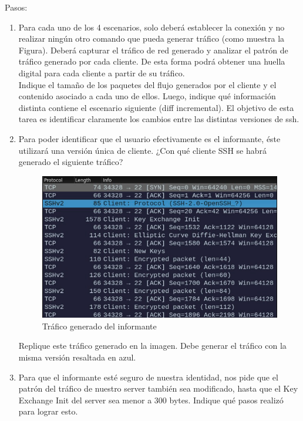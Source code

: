 \documentclass[letter,12pt]{article}
\begin{document}
Pasos:

\begin{enumerate}
\item Para cada uno de los 4 escenarios, solo deberá establecer la conexión y no realizar ningún otro comando que pueda generar tráfico (como muestra la Figura). Deberá capturar el tráfico de red generado y analizar el patrón de tráfico generado por cada cliente. De esta forma podrá obtener una huella digital para cada cliente a partir de su tráfico.\\

Indique el tamaño de los paquetes del flujo generados por el cliente y el contenido asociado a cada uno de ellos. Luego, indique qué información distinta contiene el escenario siguiente (diff incremental). El objetivo de esta tarea es identificar claramente los cambios entre las distintas versiones de ssh.

\newpage

\item Para poder identificar que el usuario efectivamente es el informante, éste utilizará una versión única de cliente. ¿Con qué cliente SSH se habrá generado el siguiente tráfico?

\begin{figure}[H]
    \centering
    \includegraphics[width=17.5cm]{Desarrollo/trafico.png}
    \caption{Tráfico generado del informante}
    \label{fig:ASCII}
\end{figure}

Replique este tráfico generado en la imagen. Debe generar el tráfico con la misma versión resaltada en azul.

\newpage

\item Para que el informante esté seguro de nuestra identidad, nos pide que el patrón del tráfico de nuestro server también sea modificado, hasta que el Key Exchange Init del server sea menor a 300 bytes. Indique qué pasos realizó para lograr esto.


\end{enumerate}
\end{document}
